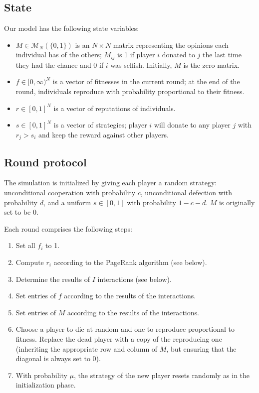 \documentclass{amsart}
\begin{document}
\subsection{State}

Our model has the following state variables:

\begin{itemize}
\item $M \in \mathcal{M}_N(\{0,1\})$ is an $N \times N$ matrix
  representing the opinions each individual has of the others;
  $M_{ij}$ is 1 if player $i$ donated to $j$ the last time they had
  the chance and 0 if $i$ was selfish. Initially, $M$ is the zero
  matrix.
\item $f \in [0, \infty)^N$ is a vector of fitnesses in the current
  round; at the end of the round, individuals reproduce with
  probability proportional to their fitness.
\item $r \in [0,1]^N$ is a vector of reputations of individuals.
\item $s \in [0,1]^N$ is a vector of strategies; player $i$ will
  donate to any player $j$ with $r_j > s_i$ and keep the reward
  against other players.
\end{itemize}

\subsection{Round protocol}
The simulation is initialized by giving each player a random strategy:
unconditional cooperation with probability $c$, unconditional
defection with probability $d$, and a uniform $s \in [0,1]$ with
probability $1 - c- d$. $M$ is originally set to be $0$.

Each round comprises the following steps:

\begin{enumerate}
\item Set all $f_i$ to 1.
\item Compute $r_i$ according to the PageRank algorithm (see below).
\item Determine the results of $I$ interactions (see below).
\item Set entries of $f$ according to the results of the interactions.
\item Set entries of $M$ according to the results of the interactions.
\item Choose a player to die at random and one to reproduce
  proportional to fitness. Replace the dead player with a copy of the
  reproducing one (inheriting the appropriate row and column of $M$,
  but ensuring that the diagonal is always set to 0).
\item With probability $\mu$, the strategy of the new player resets
  randomly as in the initialization phase.
\end{enumerate}
\end{document}
